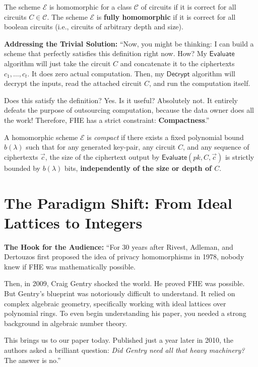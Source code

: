 \begin{definition}
The scheme $\mathcal{E}$ is homomorphic for a class $\mathcal{C}$ of circuits if it is correct for all circuits $C \in \mathcal{C}$. The scheme $\mathcal{E}$ is \textbf{fully homomorphic} if it is correct for all boolean circuits (i.e., circuits of arbitrary depth and size).
\end{definition}

\begin{speakernote}
\textbf{Addressing the Trivial Solution:}
``Now, you might be thinking: I can build a scheme that perfectly satisfies this definition right now. How? My $\mathsf{Evaluate}$ algorithm will just take the circuit $C$ and concatenate it to the ciphertexts $c_1, \dots, c_t$. It does zero actual computation. Then, my $\mathsf{Decrypt}$ algorithm will decrypt the inputs, read the attached circuit $C$, and run the computation itself. 

Does this satisfy the definition? Yes. Is it useful? Absolutely not. It entirely defeats the purpose of outsourcing computation, because the data owner does all the work! Therefore, FHE has a strict constraint: \textbf{Compactness}.''
\end{speakernote}

\begin{definition}[Compactness]
A homomorphic scheme $\mathcal{E}$ is \textit{compact} if there exists a fixed polynomial bound $b(\lambda)$ such that for any generated key-pair, any circuit $C$, and any sequence of ciphertexts $\vec{c}$, the size of the ciphertext output by $\mathsf{Evaluate}(pk, C, \vec{c})$ is strictly bounded by $b(\lambda)$ bits, \textbf{independently of the size or depth of $C$}.
\end{definition}

\section{The Paradigm Shift: From Ideal Lattices to Integers}

\begin{speakernote}
\textbf{The Hook for the Audience:}
``For 30 years after Rivest, Adleman, and Dertouzos first proposed the idea of privacy homomorphisms in 1978, nobody knew if FHE was mathematically possible. 

Then, in 2009, Craig Gentry shocked the world. He proved FHE was possible. But Gentry's blueprint was notoriously difficult to understand. It relied on complex algebraic geometry, specifically working with ideal lattices over polynomial rings. To even begin understanding his paper, you needed a strong background in algebraic number theory.

This brings us to our paper today. Published just a year later in 2010, the authors asked a brilliant question: \textit{Did Gentry need all that heavy machinery?} The answer is no.''
\end{speakernote}

